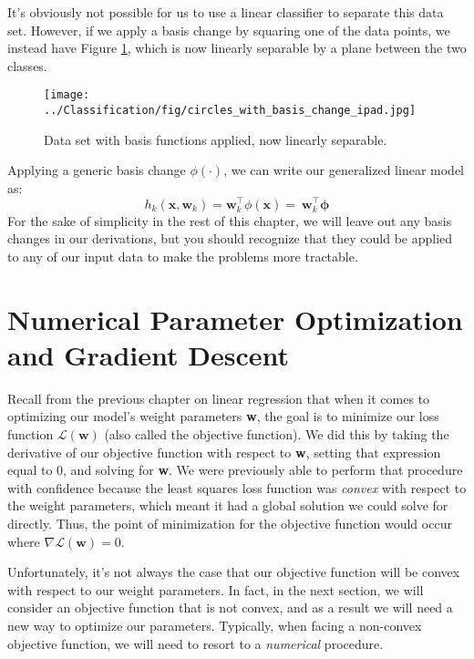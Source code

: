 It's obviously not possible for us to use a linear classifier to separate this data set. However, if we apply a basis change by squaring one of the data points, we instead have Figure \ref{fig:circles-with-basis-change}, which is now linearly separable by a plane between the two classes.
\begin{figure}
    \centering
    \texttt{[image: ../Classification/fig/circles\_with\_basis\_change\_ipad.jpg]}
    \caption{Data set with basis functions applied, now linearly separable.}
    \label{fig:circles-with-basis-change}
\end{figure}
Applying a generic basis change $\phi(\cdot)$, we can write our generalized linear model as:
\begin{equation} \label{basis-changed-linear-model}
    h_{k}(\textbf{x}, \textbf{w}_{k}) = \textbf{w}_{k}^\top\phi{(\textbf{x})} = \ \textbf{w}_{k}^\top\boldsymbol{\phi}
\end{equation}
For the sake of simplicity in the rest of this chapter, we will leave out any basis changes in our derivations, but you should recognize that they could be applied to any of our input data to make the problems more tractable.


\section{Numerical Parameter Optimization and Gradient Descent}
Recall from the previous chapter on linear regression that when it comes to optimizing our model's weight parameters \textbf{w}, the goal is to minimize our loss function $\mathcal{L}(\textbf{w})$ (also called the objective function). We did this by taking the derivative of our objective function with respect to \textbf{w}, setting that expression equal to 0, and solving for \textbf{w}. We were previously able to perform that procedure with confidence because the least squares loss function was \textit{convex} with respect to the weight parameters, which meant it had a global solution we could solve for directly. Thus, the point of minimization for the objective function would occur where $\nabla \mathcal{L}(\textbf{w}) = 0$.

Unfortunately, it's not always the case that our objective function will be convex with respect to our weight parameters. In fact, in the next section, we will consider an objective function that is not convex, and as a result we will need a new way to optimize our parameters. Typically, when facing a non-convex objective function, we will need to resort to a \textit{numerical} procedure.

